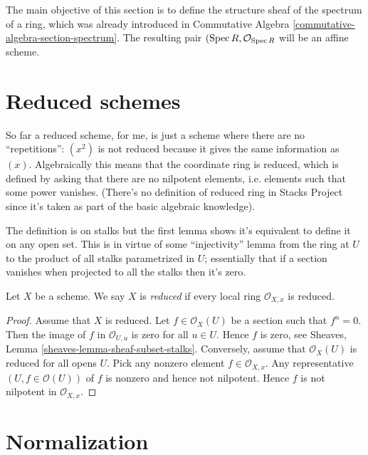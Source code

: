 \noindent
The main objective of this section is
to define the structure sheaf of the
spectrum of a ring, which
was already introduced in 
Commutative Algebra 
\ref{commutative-algebra-section-spectrum}.
The resulting pair
$(\mathop{\mathrm{Spec}} R, \mathcal{O}_{\mathop{\mathrm{Spec}} R}$
will be an affine scheme.

\section{Reduced schemes}
\label{section-reduced}

\noindent
So far a reduced scheme,
for me,
is just a scheme where there are
no ``repetitions'':
$(x^2)$ is not reduced because
it gives the same information as $(x)$.
Algebraically this means that the
coordinate ring is reduced,
which is defined by asking
that there are no nilpotent elements,
i.e. elements such that some power vanishes.
(There's no definition of reduced ring in
Stacks Project
since it's taken as part of the basic
algebraic knowledge).

The definition is on stalks but the first
lemma
shows it's equivalent to define it on any
open set.
This is in virtue of some ``injectivity''
lemma
from the ring at $U$ to the product of all
stalks parametrized in $U$;
essentially that if a section vanishes when
projected to all
the stalks then it's zero.

\begin{definition}
\label{definition-reduced}
Let $X$ be a scheme. We say $X$ is {\it
reduced} if every local ring
$\mathcal{O}_{X, x}$ is reduced.
\end{definition}

\begin{proof}
Assume that $X$ is reduced.
Let $f \in \mathcal{O}_X(U)$ be a section
such that $f^n = 0$.
Then the image of $f$ in $\mathcal{O}_{U, u}$
is zero for
all $u \in U$. Hence $f$ is zero, see
Sheaves, Lemma
\ref{sheaves-lemma-sheaf-subset-stalks}.
Conversely, assume that $\mathcal{O}_X(U)$ is
reduced
for all opens $U$. Pick any nonzero element
$f \in \mathcal{O}_{X, x}$.
Any representative $(U, f \in
\mathcal{O}(U))$  of $f$ is nonzero and
hence not nilpotent. Hence $f$ is not
nilpotent in $\mathcal{O}_{X, x}$.
\end{proof}

\section{Normalization}
\label{section-normalization}

